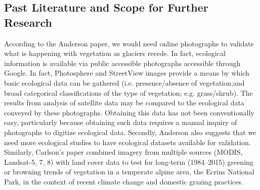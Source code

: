 \documentclass[11pt]{article}
\begin{document}
\subsection*{Past Literature and Scope for Further Research}

According to the Anderson paper, we would need online photographs to validate what is
happening with vegetation as glaciers recede. In fact, ecological information is available via
public accessible photographs accessible through Google. In fact, Photosphere
and StreetView images provide a means by which basic ecological data can be gathered (i.e.
presence/absence of vegetation;and broad categorical classifications of the type of vegetation;
e.g. grass/shrub). The results from analysis of satellite data may be compared to the ecological
data conveyed by these photographs. Obtaining this data has not been conventionally easy,
particularly because obtaining such data requires a manual inquiry of photographs to digitize
ecological data. Secondly, Anderson also suggests that we need more ecological studies to
have ecological datasets available for validation.\\

Similarly, Carlson’s paper combined imagery from multiple sources (MODIS, Landsat-5, 7, 8)
with land cover data to test for long-term (1984–2015) greening or browning trends of vegetation
in a temperate alpine area, the Ecrins National Park, in the context of recent climate change and
domestic grazing practices.\\
\end{document}
